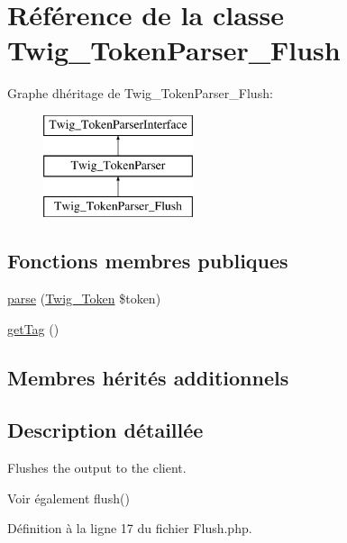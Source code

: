 \hypertarget{class_twig___token_parser___flush}{}\section{Référence de la classe Twig\+\_\+\+Token\+Parser\+\_\+\+Flush}
\label{class_twig___token_parser___flush}
Graphe d\textquotesingle{}héritage de Twig\+\_\+\+Token\+Parser\+\_\+\+Flush\+:\begin{figure}[H]
\begin{center}
\leavevmode
\includegraphics[height=3.000000cm]{class_twig___token_parser___flush}
\end{center}
\end{figure}
\subsection*{Fonctions membres publiques}
\begin{DoxyCompactItemize}
\item 
\hyperlink{class_twig___token_parser___flush_a5dfa2e269321584fb74e8b43dabe0efd}{parse} (\hyperlink{class_twig___token}{Twig\+\_\+\+Token} \$token)
\item 
\hyperlink{class_twig___token_parser___flush_ab86ba36154b20e6bbfa3ba705f12f9d6}{get\+Tag} ()
\end{DoxyCompactItemize}
\subsection*{Membres hérités additionnels}


\subsection{Description détaillée}
Flushes the output to the client.

\begin{DoxySeeAlso}{Voir également}
flush() 
\end{DoxySeeAlso}


Définition à la ligne 17 du fichier Flush.\+php.



